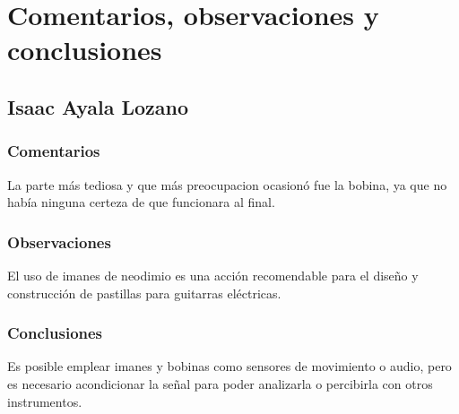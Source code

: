 \section{Comentarios, observaciones y conclusiones}
\subsection{Isaac Ayala Lozano}
\subsubsection{Comentarios}
La parte m\'as tediosa y que m\'as preocupacion ocasion\'o fue la bobina, ya que no hab\'ia ninguna certeza de que funcionara al final.

\subsubsection{Observaciones}
El uso de imanes de neodimio es una acci\'on recomendable para el dise\~no y construcci\'on de pastillas para guitarras el\'ectricas.

\subsubsection{Conclusiones}
Es posible emplear imanes y bobinas como sensores de movimiento o audio, pero es necesario acondicionar la se\~nal para poder analizarla o 
percibirla con otros instrumentos.